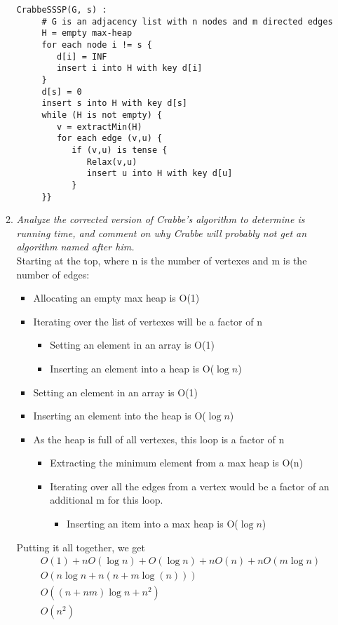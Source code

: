 \documentclass[12pt]{article}
\begin{document}
\begin{enumerate}
\begin{enumerate}
\begin{verbatim}
CrabbeSSSP(G, s) :
     # G is an adjacency list with n nodes and m directed edges
     H = empty max-heap
     for each node i != s {
        d[i] = INF
        insert i into H with key d[i]
     }
     d[s] = 0
     insert s into H with key d[s]
     while (H is not empty) {
        v = extractMin(H)
        for each edge (v,u) {
           if (v,u) is tense {
              Relax(v,u)
              insert u into H with key d[u]
           }
     }}
\end{verbatim}

	\item \textit{Analyze the corrected version of Crabbe's algorithm to determine is running time, and comment on why Crabbe will probably not get an 
algorithm named after him.}\\
    Starting at the top, where n is the number of vertexes and m is the number of edges:
    \begin{itemize}
        \item Allocating an empty max heap is O(1)
        \item Iterating over the list of vertexes will be a factor of n
        \begin{itemize}
            \item Setting an element in an array is O(1)
            \item Inserting an element into a heap is O($\log n$)
        \end{itemize}
        \item Setting an element in an array is O(1)
        \item Inserting an element into the heap is O($\log n$)
        \item As the heap is full of all vertexes, this loop is a factor of n
        \begin{itemize}
            \item Extracting the minimum element from a max heap is O(n)
            \item Iterating over all the edges from a vertex would be a factor of an additional m for this loop.
            \begin{itemize}
                \item Inserting an item into a max heap is O($\log n$)
            \end{itemize}
        \end{itemize}
    \end{itemize}
    \vspace{5mm}
    Putting it all together, we get
    \begin{align*}
        &O(1) + nO(\log n) + O(\log n) + nO(n) +nO(m\log n)\\
        &O(n\log n + n(n + m\log(n)))\\
        &O((n+nm)\log n + n^2)\\
        &O(n^2)
    \end{align*}
    

\end{enumerate}
\end{enumerate}
\end{document}
